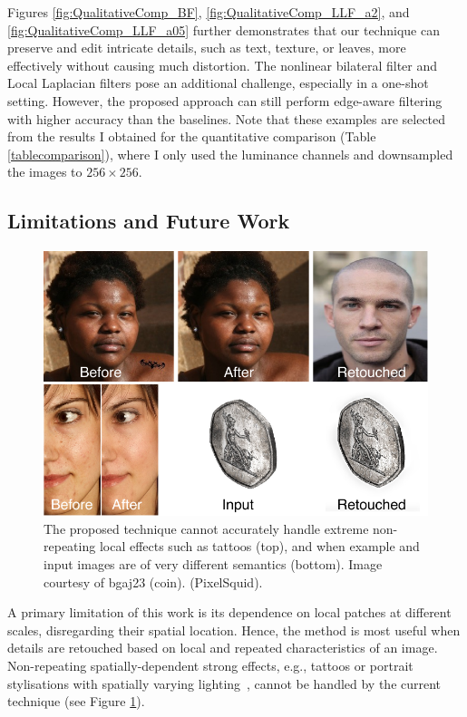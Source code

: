 Figures \ref{fig:QualitativeComp_BF}, \ref{fig:QualitativeComp_LLF_a2}, and \ref{fig:QualitativeComp_LLF_a05} further demonstrates that our technique can preserve and edit intricate details, such as text, texture, or leaves, more effectively without causing much distortion. The nonlinear bilateral filter and Local Laplacian filters pose an additional challenge, especially in a one-shot setting. However, the proposed approach can still perform edge-aware filtering with higher accuracy than the baselines. Note that these examples are selected from the results I obtained for the quantitative comparison (Table \ref{tablecomparison}), where I only used the luminance channels and downsampled the images to $256 \times 256$. 


\subsection{Limitations and Future Work}
\begin{figure}[th] %
	\centering
	\includegraphics[width=0.8\columnwidth]{Chapters/detail-retouching-figs/Limitations.pdf}
    \caption{\label{fig:limitations} The proposed technique cannot accurately handle extreme non-repeating local effects such as tattoos (top), and when example and input images are of very different semantics (bottom). Image courtesy of bgaj23 (coin). (PixelSquid).}

\end{figure}
A primary limitation of this work is its dependence on local patches at different scales, disregarding their spatial location. Hence, the method is most useful when details are retouched based on local and repeated characteristics of an image. Non-repeating spatially-dependent strong effects, e.g., tattoos or portrait stylisations with spatially varying lighting~\cite{Shih14Style}, cannot be handled by the current technique (see Figure \ref{fig:limitations}).


